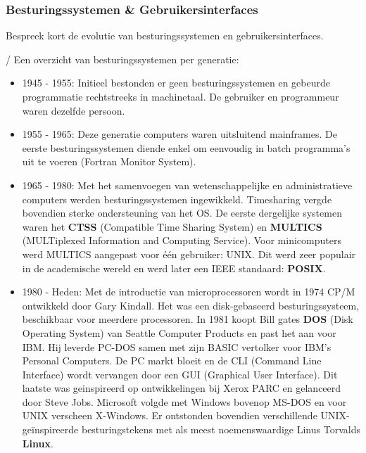 \documentclass[../main.tex]{subfiles}
\begin{document}
\subsubsection{Besturingssystemen \& Gebruikersinterfaces}
\begin{question}
Bespreek kort de evolutie van besturingssystemen en gebruikersinterfaces.
\end{question}
\begin{solution}/
Een overzicht van besturingssystemen per generatie:
\begin{itemize}
	\item 1945 - 1955: Initieel bestonden er geen besturingssystemen en gebeurde programmatie rechtstreeks in machinetaal. De gebruiker en programmeur waren dezelfde persoon.
	\item 1955 - 1965: Deze generatie computers waren uitsluitend mainframes. De eerste besturingssystemen diende enkel om eenvoudig in batch programma's uit te voeren (Fortran Monitor System).
	\item 1965 - 1980: Met het samenvoegen van wetenschappelijke en administratieve computers werden besturingssystemen ingewikkeld. Timesharing vergde bovendien sterke ondersteuning van het OS.
	De eerste dergelijke systemen waren het \textbf{CTSS} (Compatible Time Sharing System) en \textbf{MULTICS} (MULTiplexed Information and Computing Service). Voor minicomputers werd MULTICS aangepast voor \'e\'en gebruiker: UNIX. Dit werd zeer populair in de academische wereld en werd later een IEEE standaard: \textbf{POSIX}.
	\item 1980 - Heden: Met de introductie van microprocessoren wordt in 1974 CP/M ontwikkeld door Gary Kindall. Het was een disk-gebaseerd besturingssysteem, beschikbaar voor meerdere processoren. In 1981 koopt Bill gates \textbf{DOS} (Disk Operating System) van Seattle Computer Products en past het aan voor IBM. Hij leverde PC-DOS samen met zijn BASIC vertolker voor IBM's Personal Computers. De PC markt bloeit en de CLI (Command Line Interface) wordt vervangen door een GUI (Graphical User Interface). Dit laatste was geinspireerd op ontwikkelingen bij Xerox PARC en gelanceerd door Steve Jobs. Microsoft volgde met Windows bovenop MS-DOS en voor UNIX verscheen X-Windows. Er ontstonden bovendien verschillende UNIX-ge\"inspireerde besturingstekens met als meest noemenswaardige Linus Torvalds \textbf{Linux}.
\end{itemize}
\end{solution}
\end{document}
